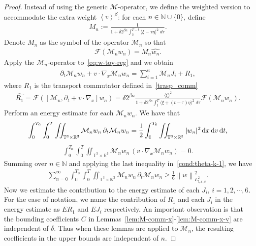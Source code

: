 \documentclass[11pt,american, reqno]{amsart}
\numberwithin{equation}{section}
\newcommand{\N}{\mathbb N}
\newcommand{\R}{\mathbb R}
\newcommand{\1}{\mathds{1}}
\newcommand{\del}{\partial}
\newcommand{\dt}{\, {\rm d} t}
\newcommand{\dv}{\, {\rm d} v}
\newcommand{\dx}{\, {\rm d} x}
\newcommand{\CalM}{\mathcal{M}}
\newcommand{\CalF}{\mathcal{F}}
\newcommand{\vpran}[1]{\left(#1\right)}
\newcommand{\norm}[1]{\left\lVert#1\right\rVert}
\newcommand{\vint}[1]{\left\langle#1\right\rangle}
\newcommand{\T}{\mathbb{T}}
\numberwithin{equation}{section}
\begin{document}
\begin{proof}
Instead of using the generic $\CalM$-operator, we define the weighted version to accommodate the extra weight $\vint{v}^\beta$: for each $n \in \N \cup \{0\}$, define
\begin{align*}
  M_n
:= \frac{1}{1 + \delta 2^{\beta n} \int_0^{T-t} \langle \xi - \tau \eta\rangle^{2} \;d\tau}.
\end{align*}
Denote $M_n$ as the symbol of the operator $\CalM_n$ so that
\begin{align*}
 \CalF\vpran{\CalM_n w_n}
=  M_n \widehat{w_n}.
\end{align*}
Apply the $\CalM_n$-operator to~\eqref{eq:w-toy-reg} and we obtain 
\begin{align*}
  \del_t \CalM_n w_n + v \cdot \nabla_x \CalM_n w_n
= \sum_{i=1}^6 \CalM_n J_i + R_1,
\end{align*}
where $R_1$ is the transport commutator defined in~\eqref{trasp_comm}
\begin{align} \label{def:R-1}
\widehat{R_1} = \CalF\vpran{[\CalM_n, \del_t + v \cdot \nabla_x] w_n}
= \delta 2^{\beta n} \tfrac{\langle \xi \rangle^{2}}{1 + \delta 2^{\beta n} \int_t ^T \langle \xi +(t- \tau) \eta\rangle^{2} \;d\tau} \CalF\vpran{\CalM_n w_n}.
\end{align}
Perform an energy estimate for each $\CalM_n w_n$. We have that
\begin{align*}
   \int_0^{T_0} \int_0^T \iint_{\T^3 \times \R^3}
   \CalM_n w_n \, \del_t \CalM_n w_n
= \frac{1}{2} \int_0^{T_0}      
   \iint_{\T^3 \times \R^3}
|w_n|^2 \dx\dv\dt,
\end{align*}
\begin{align*}
 \int_0^{T_0} \int_0^T \iint_{\T^3 \times \R^3}
   \CalM_n w_n \, \vpran{v \cdot \nabla_x \CalM_n w_n} = 0.
\end{align*}
Summing over $n \in \N$ and applying the last inequality in~\eqref{cond:theta-k-1}, we have
\begin{align} \label{est:LHS}
\sum_{n=0}^\infty
\int_0^{T_0} \int_0^T \iint_{\T^3 \times \R^3}
   \CalM_n w_n \, \del_t \CalM_n w_n
\geq \frac{1}{6}
  \norm{w}_{L^2_{t,x,v}}^2.
\end{align}
Now we estimate the contribution to the energy estimate of each $J_i$, $i = 1, 2, \cdots, 6$. For the ease of notation, we name the contribution of $R_1$ and each $J_i$ in the energy estimate as $ER_1$ and $EJ_i$ respectively. An important observation is that the bounding coefficients $C$ in Lemmas~\ref{lem:M-comm-x}-\ref{lem:M-comm-x-v} are independent of $\delta$. Thus when these lemmas are applied to $\CalM_n$, the resulting coefficients in the upper bounds are independent of $n. $


\end{proof}
\end{document}
